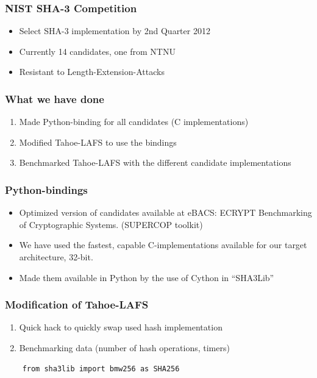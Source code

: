 \documentclass[screen]{beamer}
\begin{document}
\begin{frame}
  \frametitle{NIST SHA-3 Competition}
  \begin{itemize}
  \item Select SHA-3 implementation by 2nd Quarter 2012
  \item Currently 14 candidates, one from NTNU
  \item Resistant to Length-Extension-Attacks
  \end{itemize}
\end{frame}

\begin{frame}
  \frametitle{What we have done}
  \begin{enumerate}
  \item Made Python-binding for all candidates (C implementations)
  \item Modified Tahoe-LAFS to use the bindings
  \item Benchmarked Tahoe-LAFS with the different candidate implementations
  \end{enumerate}
\end{frame}

\begin{frame}
  \frametitle{Python-bindings}
  \begin{itemize}
  \item Optimized version of candidates available at eBACS: ECRYPT Benchmarking
  of Cryptographic Systems. (SUPERCOP toolkit)
  \item We have used the fastest, capable C-implementations available for our target
  architecture, 32-bit.
  \item Made them available in Python by the use of Cython in ``SHA3Lib''
  \end{itemize}
\end{frame}

\begin{frame}[fragile]
  \frametitle{Modification of Tahoe-LAFS}
  \begin{enumerate}
  \item Quick hack to quickly swap used hash implementation
  \item Benchmarking data (number of hash operations, timers)
  \end{enumerate}

  \begin{lstlisting}
    from sha3lib import bmw256 as SHA256
  \end{lstlisting}

\end{frame}
\end{document}
